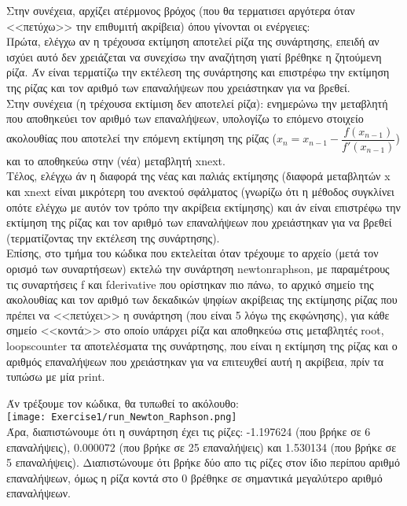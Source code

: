 \documentclass[a4paper,11pt]{article}
\newcommand{\lt}{\latintext}
\begin{document}
Στην συνέχεια, αρχίζει ατέρμονος βρόχος (που θα τερματισει αργότερα όταν <<πετύχω>> την επιθυμιτή ακρίβεια) όπου γίνονται οι ενέργειες:\\
Πρώτα, ελέγχω αν η τρέχουσα εκτίμηση αποτελεί ρίζα της συνάρτησης, επειδή αν ισχύει αυτό δεν χρειάζεται να συνεχίσω την αναζήτηση γιατί βρέθηκε η ζητούμενη ρίζα. Άν είναι τερματίζω την εκτέλεση της συνάρτησης και επιστρέφω την εκτίμηση της ρίζας και τον αριθμό των επαναλήψεων που χρειάστηκαν για να βρεθεί.\\
Στην συνέχεια (η τρέχουσα εκτίμιση δεν αποτελεί ρίζα): ενημερώνω την μεταβλητή που αποθηκεύει τον αριθμό των επαναλήψεων, υπολογίζω το επόμενο στοιχείο ακολουθίας που αποτελεί την επόμενη εκτίμηση της ρίζας ($x_n = x_{n-1} - \dfrac{f(x_{n-1})}{f'(x_{n-1})}$) και το αποθηκεύω στην (νέα) μεταβλητή {\lt x\textunderscore next}.\\
Τέλος, ελέγχω άν η διαφορά της νέας και παλιάς εκτίμησης (διαφορά μεταβλητών {\lt x} και {\lt x\textunderscore next} είναι μικρότερη του ανεκτού σφάλματος (γνωρίζω ότι η μέθοδος συγκλίνει οπότε ελέγχω με αυτόν τον τρόπο την ακρίβεια εκτίμησης) και άν είναι επιστρέφω την εκτίμηση της ρίζας και τον αριθμό των επαναλήψεων που χρειάστηκαν για να βρεθεί (τερματίζοντας την εκτέλεση της συνάρτησης).\\

Επίσης, στο τμήμα του κώδικα που εκτελείται όταν τρέχουμε το αρχείο (μετά τον ορισμό των συναρτήσεων) εκτελώ την συνάρτηση {\lt newton\textunderscore raphson}, με παραμέτρους τις συναρτήσεις {\lt f} και {\lt f\textunderscore derivative} που ορίστηκαν πιο πάνω, το αρχικό σημείο της ακολουθίας και τον αριθμό των δεκαδικών ψηφίων ακρίβειας της εκτίμησης ρίζας που πρέπει να <<πετύχει>> η συνάρτηση (που είναι 5 λόγω της εκφώνησης), για κάθε σημείο <<κοντά>> στο οποίο υπάρχει ρίζα και αποθηκεύω στις μεταβλητές {\lt root, loops\textunderscore counter} τα αποτελέσματα της συνάρτησης, που είναι η εκτίμηση της ρίζας και ο αριθμός επαναλήψεων που χρειάστηκαν για να επιτευχθεί αυτή η ακρίβεια, πρίν τα τυπώσω με μία {\lt print}.

Άν τρέξουμε τον κώδικα, θα τυπωθεί το ακόλουθο:\\

\texttt{[image: Exercise1/run\_Newton\_Raphson.png]}\\

Άρα, διαπιστώνουμε ότι η συνάρτηση έχει τις ρίζες: -1.197624 (που βρήκε σε 6 επαναλήψεις), 0.000072 (που βρήκε σε 25 επαναλήψεις) και 1.530134 (που βρήκε σε 5 επαναλήψεις). Διαπιστώνουμε ότι βρήκε δύο απο τις ρίζες στον ίδιο περίπου αριθμό επαναλήψεων, όμως η ρίζα κοντά στο 0 βρέθηκε σε σημαντικά μεγαλύτερο αριθμό επαναλήψεων.\\
\end{document}
